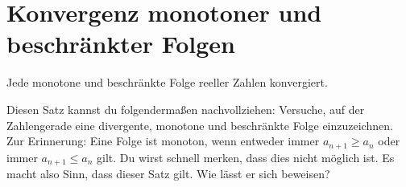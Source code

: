 \documentclass[fontsize=9pt,
               parskip=half-,
               DIV=14,
               listof=chapterentry,
               tocflat]{scrbook}
\begin{document}
\section{Konvergenz monotoner und beschränkter Folgen}

\begin{theorem*}
Jede monotone und beschränkte Folge reeller Zahlen konvergiert.

\end{theorem*}

\begin{explanation*}
Diesen Satz kannst du folgendermaßen nachvollziehen: Versuche, auf der Zahlengerade eine divergente, monotone und beschränkte Folge einzuzeichnen. Zur Erinnerung: Eine Folge ist monoton, wenn entweder immer $a_{n+1}\geq a_{n}$ oder immer $a_{n+1}\leq a_{n}$ gilt. Du wirst schnell merken, dass dies nicht möglich ist. Es macht also Sinn, dass dieser Satz gilt. Wie lässt er sich beweisen?

\end{explanation*}
\end{document}
